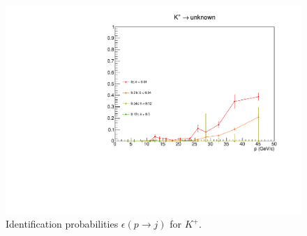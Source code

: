 \begin{figure}[!p]
  \includegraphics[scale=0.38]{./gfx/Kp_u.pdf}
	\caption{Identification probabilities $\epsilon(p \rightarrow j)$ for $K^+$.}
	\label{pic:Effkp}
\end{figure}

